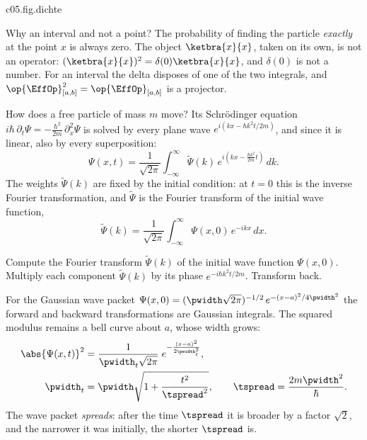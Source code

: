 \begin{tpcfigure}{c05.fig.dichte}
  \caption{The same wave function twice: the Gaussian wave packet
    $\Psi(x) = (2\pi)^{-1/4} e^{-x^2/4} e^{3ix}$. (a) Real and imaginary part change sign all
    the time; dotted, the envelope $\pm\abs{\Psi}$. (b) Of the factor $e^{3ix}$ nothing is left
    in $p = \abs{\Psi}^2$. The area over $[a,b]$ is the response probability of the detector
    $\op{\EffOp}_{[a,b]}$, Equation~\eqref{c05.eq.intervall}. The narrow strip of width
    $\varepsilon$ at $c$ is the same construction, only narrower: as $\varepsilon$ shrinks, the
    area shrinks with it.}
\end{tpcfigure}

Why an interval and not a point? The probability of finding the particle \emph{exactly} at the
point $x$ is always zero. The object $\ketbra{x}{x}$, taken on its own, is not an operator:
$(\ketbra{x}{x})^2 = \delta(0)\ketbra{x}{x}$, and $\delta(0)$ is not a number. For an interval
the delta disposes of one of the two integrals, and
$\op{\EffOp}_{[a,b]}^2 = \op{\EffOp}_{[a,b]}$ is a projector.

How does a free particle of mass $m$ move? Its Schrödinger equation
$i\hbar\,\partial_t\Psi = -\frac{\hbar^2}{2m}\,\partial_x^2\Psi$ is solved by every plane wave
$e^{i(kx - \hbar k^2 t/2m)}$, and since it is linear, also by every superposition:
\begin{equation}\label{c05.eq.freieloesung}
  \Psi(x,t) = \frac{1}{\sqrt{2\pi}}\int_{-\infty}^{\infty} \widetilde{\Psi}(k)\,
  e^{i\left(kx-\frac{\hbar k^2}{2m}t\right)}\,dk .
\end{equation}
The weights $\widetilde{\Psi}(k)$ are fixed by the initial condition: at $t = 0$ this is the
inverse Fourier transformation, and $\widetilde{\Psi}$ is the Fourier transform of the initial
wave function,
\begin{equation}\label{c05.eq.phik}
  \widetilde{\Psi}(k) = \frac{1}{\sqrt{2\pi}}\int_{-\infty}^{\infty} \Psi(x,0)\,e^{-ikx}\,dx .
\end{equation}

\begin{merksatz}
  Compute the Fourier transform $\widetilde{\Psi}(k)$ of the initial wave function
  $\Psi(x,0)$. Multiply each component $\widetilde{\Psi}(k)$ by its phase
  $e^{-i\hbar k^2t/2m}$. Transform back.
\end{merksatz}

For the Gaussian wave packet
$\Psi(x,0) = (\pwidth\sqrt{2\pi})^{-1/2}\, e^{-(x-a)^2/4\pwidth^2}$ the forward and backward
transformations are Gaussian integrals. The squared modulus remains a bell curve about $a$,
whose width grows:
\begin{align}
  \abs{\Psi(x,t)}^2 &= \frac{1}{\pwidth_t\sqrt{2\pi}}\;
  e^{-\frac{(x-a)^2}{2\pwidth_t^2}}, \label{c05.eq.zerfliessen}\\
  \pwidth_t &= \pwidth\sqrt{1+\frac{t^2}{\tspread^2}},
  \qquad
  \tspread = \frac{2m\pwidth^2}{\hbar}. \notag
\end{align}
The wave packet \emph{spreads}: after the time $\tspread$ it is broader by a factor $\sqrt{2}$,
and the narrower it was initially, the shorter $\tspread$ is.

